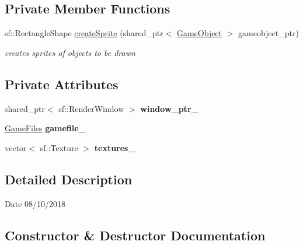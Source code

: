 \subsection*{Private Member Functions}
\begin{DoxyCompactItemize}
\item 
sf\+::\+Rectangle\+Shape \mbox{\hyperlink{class_animate_a837bb2a4b1929fe538408c8d89de1969}{create\+Sprite}} (shared\+\_\+ptr$<$ \mbox{\hyperlink{class_game_object}{Game\+Object}} $>$ gameobject\+\_\+ptr)
\begin{DoxyCompactList}\small\item\em creates sprites of objects to be drawn \end{DoxyCompactList}\end{DoxyCompactItemize}
\subsection*{Private Attributes}
\begin{DoxyCompactItemize}
\item 
\mbox{\label{class_animate_a39c62ce76ddfa2aede6bbbdd081c2263}} 
shared\+\_\+ptr$<$ sf\+::\+Render\+Window $>$ {\bfseries window\+\_\+ptr\+\_\+}
\item 
\mbox{\label{class_animate_ad010d52b080f8f7bed5a63327a08f52e}} 
\mbox{\hyperlink{class_game_files}{Game\+Files}} {\bfseries gamefile\+\_\+}
\item 
\mbox{\label{class_animate_a53fd51bce3ba48076bb975f803152fc6}} 
vector$<$ sf\+::\+Texture $>$ {\bfseries textures\+\_\+}
\end{DoxyCompactItemize}


\subsection{Detailed Description}
\begin{DoxyDate}{Date}
08/10/2018 
\end{DoxyDate}


\subsection{Constructor \& Destructor Documentation}
\mbox{\label{class_animate_ac76ff6cc4d70ec93f9b93ccc5c843b48}} 

